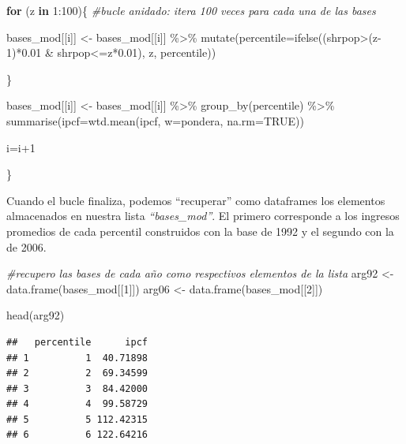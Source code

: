 \documentclass[
]{book}
\newenvironment{Shaded}{\begin{snugshade}}{\end{snugshade}}
\newcommand{\AttributeTok}[1]{\textcolor[rgb]{0.77,0.63,0.00}{#1}}
\newcommand{\CommentTok}[1]{\textcolor[rgb]{0.56,0.35,0.01}{\textit{#1}}}
\newcommand{\ConstantTok}[1]{\textcolor[rgb]{0.00,0.00,0.00}{#1}}
\newcommand{\ControlFlowTok}[1]{\textcolor[rgb]{0.13,0.29,0.53}{\textbf{#1}}}
\newcommand{\DecValTok}[1]{\textcolor[rgb]{0.00,0.00,0.81}{#1}}
\newcommand{\FloatTok}[1]{\textcolor[rgb]{0.00,0.00,0.81}{#1}}
\newcommand{\FunctionTok}[1]{\textcolor[rgb]{0.00,0.00,0.00}{#1}}
\newcommand{\NormalTok}[1]{#1}
\newcommand{\OtherTok}[1]{\textcolor[rgb]{0.56,0.35,0.01}{#1}}
\newcommand{\SpecialCharTok}[1]{\textcolor[rgb]{0.00,0.00,0.00}{#1}}
\begin{document}
\begin{Shaded}
\begin{Highlighting}[]
      \ControlFlowTok{for}\NormalTok{ (z }\ControlFlowTok{in} \DecValTok{1}\SpecialCharTok{:}\DecValTok{100}\NormalTok{)\{  }\CommentTok{\#bucle anidado: itera 100 veces para cada una de las bases }
    
\NormalTok{        bases\_mod[[i]] }\OtherTok{\textless{}{-}}\NormalTok{ bases\_mod[[i]] }\SpecialCharTok{\%\textgreater{}\%} \FunctionTok{mutate}\NormalTok{(}\AttributeTok{percentile=}\FunctionTok{ifelse}\NormalTok{((shrpop}\SpecialCharTok{\textgreater{}}\NormalTok{(z}\DecValTok{{-}1}\NormalTok{)}\SpecialCharTok{*}\FloatTok{0.01} \SpecialCharTok{\&}\NormalTok{ shrpop}\SpecialCharTok{\textless{}=}\NormalTok{z}\SpecialCharTok{*}\FloatTok{0.01}\NormalTok{), z, percentile)) }
        
\NormalTok{      \}  }
  
\NormalTok{  bases\_mod[[i]] }\OtherTok{\textless{}{-}}\NormalTok{ bases\_mod[[i]] }\SpecialCharTok{\%\textgreater{}\%} \FunctionTok{group\_by}\NormalTok{(percentile) }\SpecialCharTok{\%\textgreater{}\%} 
                                       \FunctionTok{summarise}\NormalTok{(}\AttributeTok{ipcf=}\FunctionTok{wtd.mean}\NormalTok{(ipcf, }\AttributeTok{w=}\NormalTok{pondera, }\AttributeTok{na.rm=}\ConstantTok{TRUE}\NormalTok{))}
  
\NormalTok{  i}\OtherTok{=}\NormalTok{i}\SpecialCharTok{+}\DecValTok{1}  
  
\NormalTok{\}}
\end{Highlighting}
\end{Shaded}

Cuando el bucle finaliza, podemos ``recuperar'' como dataframes los elementos almacenados en nuestra lista \emph{``bases\_mod''}. El primero corresponde a los ingresos promedios de cada percentil construidos con la base de 1992 y el segundo con la de 2006.

\begin{Shaded}
\begin{Highlighting}[]
\CommentTok{\#recupero las bases de cada año como respectivos elementos de la lista}
\NormalTok{arg92 }\OtherTok{\textless{}{-}} \FunctionTok{data.frame}\NormalTok{(bases\_mod[[}\DecValTok{1}\NormalTok{]])}
\NormalTok{arg06 }\OtherTok{\textless{}{-}} \FunctionTok{data.frame}\NormalTok{(bases\_mod[[}\DecValTok{2}\NormalTok{]])}

\FunctionTok{head}\NormalTok{(arg92)}
\end{Highlighting}
\end{Shaded}

\begin{verbatim}
##   percentile      ipcf
## 1          1  40.71898
## 2          2  69.34599
## 3          3  84.42000
## 4          4  99.58729
## 5          5 112.42315
## 6          6 122.64216
\end{verbatim}
\end{document}

